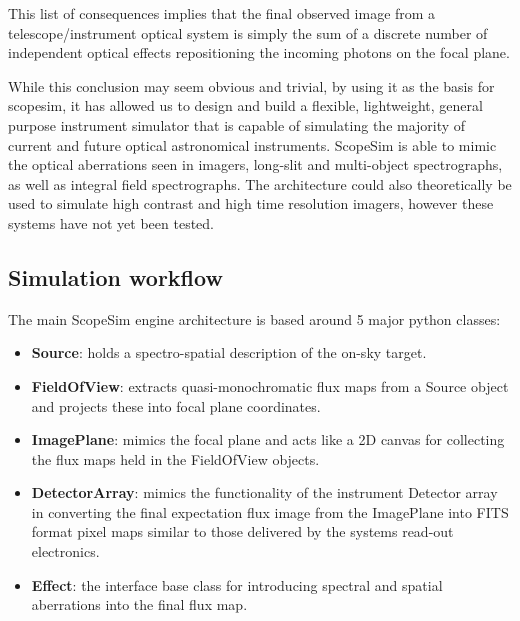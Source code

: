 This list of consequences implies that the final observed image from a telescope/instrument optical system is simply the sum of a discrete number of independent optical effects repositioning the incoming photons on the focal plane.

While this conclusion may seem obvious and trivial, by using it as the basis for scopesim, it has allowed us to design and build a flexible, lightweight, general purpose instrument simulator that is capable of simulating the majority of current and future optical astronomical instruments.
ScopeSim is able to mimic the optical aberrations seen in imagers, long-slit and multi-object spectrographs, as well as integral field spectrographs.
The architecture could also theoretically be used to simulate high contrast and high time resolution imagers, however these systems have not yet been tested.


\subsection{Simulation workflow%
  \label{simulation-workflow}%
}

The main ScopeSim engine architecture is based around 5 major python classes:

\begin{itemize}
\item \textbf{Source}: holds a spectro-spatial description of the on-sky target.

\item \textbf{FieldOfView}: extracts quasi-monochromatic flux maps from a Source object and projects these into focal plane coordinates.

\item \textbf{ImagePlane}: mimics the focal plane and acts like a 2D canvas for collecting the flux maps held in the FieldOfView objects.

\item \textbf{DetectorArray}: mimics the functionality of the instrument Detector array in converting the final expectation flux image from the ImagePlane into FITS format pixel maps similar to those delivered by the systems read-out electronics.

\item \textbf{Effect}: the interface base class for introducing spectral and spatial aberrations into the final flux map.
\end{itemize}

